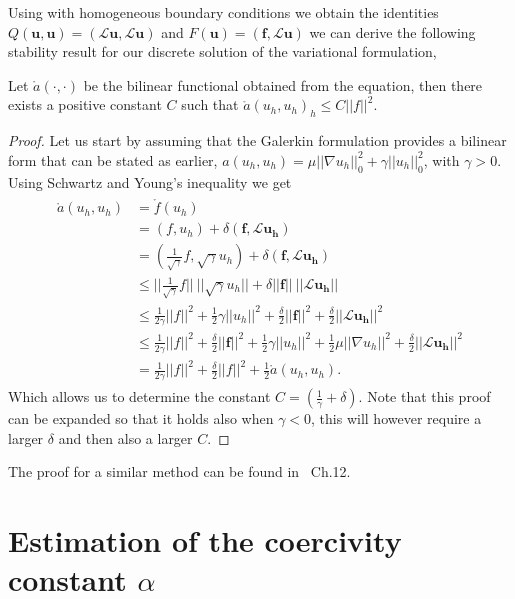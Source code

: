 Using  with homogeneous boundary conditions we obtain the identities $Q(\mathbf{u},\mathbf{u}) = (\mathcal{L}\mathbf{u},\mathcal{L}\mathbf{u})$ and $F(\mathbf{u}) = (\mathbf{f},\mathcal{L}\mathbf{u})$ we can derive the following stability result for our discrete solution of the variational formulation, 
\begin{lemma}
	Let $\mathring{a}(\cdot,\cdot)$ be the bilinear functional obtained from the equation, then there exists a positive constant $C$ such that $\mathring{a}(u_h,u_h)_h \leq C ||f||^2$.
	\label{lemmaStability}
\end{lemma}

\begin{proof}
Let us start by assuming that the Galerkin formulation provides a bilinear form that can be stated as earlier, $a(u_h,u_h)= \mu||\nabla u_h||^2_0 + \gamma||u_h||^2_0$, with $\gamma > 0$. Using Schwartz and Young's inequality we get 
%
\begin{align}
	\begin{split}
	\mathring{a}(u_h,u_h) &= \mathring{f}(u_h) \\
	&= (f,u_h) + \delta(\mathbf{f},\mathcal{L}\mathbf{u_h}) \\
	&= (\frac{1}{\sqrt{\gamma}}f,\sqrt{\gamma}u_h) + \delta(\mathbf{f},\mathcal{L}\mathbf{u_h}) \\
	&\leq ||\frac{1}{\sqrt{\gamma}}f||\:||\sqrt{\gamma}u_h||+\delta||\mathbf{f}||\:||\mathcal{L}\mathbf{u_h}|| \\
	&\leq \frac{1}{2\gamma}||f||^2 + \frac{1}{2}\gamma||u_h||^2 + \frac{\delta}{2}||\mathbf{f}||^2 + \frac{\delta}{2}||\mathcal{L}\mathbf{u_h}||^2 \\
	&\leq \frac{1}{2\gamma}||f||^2 + \frac{\delta}{2}||\mathbf{f}||^2 + \frac{1}{2}\gamma||u_h||^2 + \frac{1}{2}\mu||\nabla u_h||^2 + \frac{\delta}{2}||\mathcal{L}\mathbf{u_h}||^2 \\
	&= \frac{1}{2\gamma}||f||^2 + \frac{\delta}{2}||f||^2 + \frac{1}{2}\mathring{a}(u_h,u_h).
	\end{split}
	\label{eq:derivationStabilityResult}
\end{align}
%
Which allows us to determine the constant $C= (\frac{1}{\gamma}+\delta)$. Note that this proof can be expanded so that it holds also when $\gamma <0$, this will however require a larger $\delta$ and then also a larger $C$.	
\end{proof}
The proof for a similar method can be found in~\cite{Quarteroni} Ch.12. 
\section{Estimation of the coercivity constant $\alpha$}

